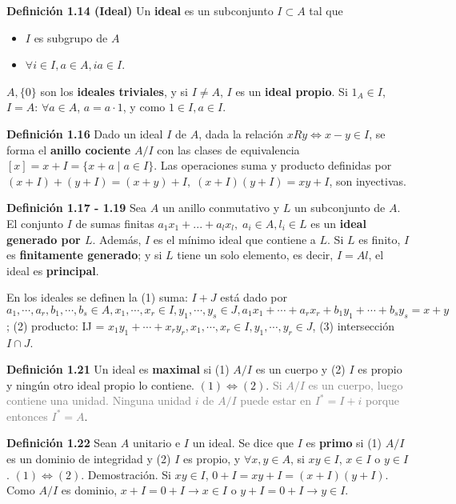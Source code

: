 \documentclass[a4paper, 11pt]{extarticle}
\newcommand{\defi}[1]{\textcolor{azul}{\textbf{Definición #1}}}
\newcommand{\dem}[1]{\textcolor{gris}{\small{Demostración. #1}}}
\begin{document}
\defi{1.14 (Ideal)} Un \textbf{ideal} es un subconjunto \(I \subset A\) tal que \vspace{-1em}
\begin{itemize}
\item \(I\) es subgrupo de \(A\)
\item \(\forall i \in I, a \in A, ia \in I\).
\end{itemize}
\(A, \{ 0 \}\) son los \textbf{ideales triviales}, y si \(I \neq A\), \(I\) es un  
\textbf{ideal propio}. Si \(1_A \in I\), \(I = A\): \(\forall a \in A\), \(a = a
\cdot 1\), y como \(1 \in I, a \in I\).

\defi{1.16} Dado un ideal \(I\) de \(A\), dada la relación \(xRy \iff x-y
\in I\), se forma el \textbf{anillo cociente} \(A/I\) con las clases de equivalencia
\([x] = x + I = \{ x + a \;|\; a \in I  \}\).
Las operaciones suma y producto definidas por \((x + I) + (y + I) = (x + y) +
I, \; (x + I)(y + I) = xy + I\), son inyectivas.

\defi{1.17 - 1.19} Sea \(A\) un anillo conmutativo y \(L\) un subconjunto de \(A\). El conjunto \(I\) de sumas finitas \(a_1x_1 + ... + a_lx_l,\; a_i \in A,
l_i \in L\) es un \textbf{ideal generado por \(L\)}. Además, \(I\) es el mínimo 
ideal que contiene a \(L\). Si \(L\) es finito, \(I\) es \textbf{finitamente generado}; y si \(L\) tiene
un solo elemento, es decir, \(I = Al\), el ideal es \textbf{principal}.

En los ideales se definen la (1) suma: \(I + J\) está dado por \(a_1, \cdots,
a_r, b_1, \cdots, b_s \in A, x_1, \cdots, x_r \in I, y_1, \cdots, y_s \in J,
a_1x_1 + \cdots + a_rx_r + b_1y_1 + \cdots + b_sy_s = x + y\); (2) producto: IJ
= \(x_1y_1 + \cdots + x_ry_r, x_1, \cdots, x_r \in I, y_1, \cdots, y_r \in J\), (3) intersección \(I \cap J\).

\defi{1.21} Un ideal es \textbf{maximal} si (1) \(A/I\) es un cuerpo y (2) \(I\) es
propio y ningún otro ideal propio lo contiene. \((1) \iff (2)\).
\textcolor{gray}{\footnotesize Si \( A/I  \) es
un cuerpo, luego contiene una unidad. Ninguna unidad \( i \) de \( A/I  \) puede estar
en \( I^* = I + i \) porque entonces \( I^* = A \)}.

\defi{1.22} Sean \(A\) unitario e \(I\) un ideal. Se dice que \(I\) es
\textbf{primo} si (1) \(A/I\) es un dominio de integridad y (2) \(I\) es propio, y
\(\forall x,y \in A\), si \(xy \in I\), \(x \in I\) o \(y \in I\). \((1) \iff (2)\).
\dem{ Si \( xy \in I  \), \( 0 + I = xy + I = (x+I)(y+I) \). Como \( A/I  \) es dominio, 
\( x+I = 0 + I \rightarrow x \in I \) o \( y+I = 0 + I \rightarrow y \in I  \).  }
\end{document}
